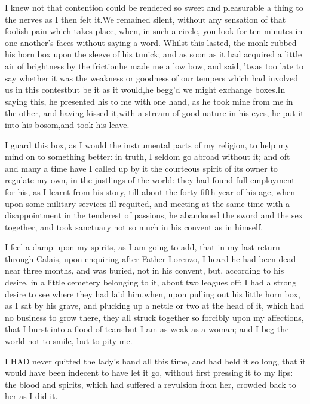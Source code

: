 \documentclass[twoside]{article}
\begin{document}
I knew not that contention could be rendered so sweet and pleasurable a
thing to the nerves as I then felt it.\tsk We remained silent, without any
sensation of that foolish pain which takes place, when, in such a circle,
you look for ten minutes in one another’s faces without saying a word.
Whilst this lasted, the monk rubbed his horn box upon the sleeve of his
tunick; and as soon as it had acquired a little air of brightness by the
friction\tsk he made me a low bow, and said, ’twas too late to say whether it
was the weakness or goodness of our tempers which had involved us in this
contest\tsk but be it as it would,\tsk he begg’d we might exchange boxes.\tsk In
saying this, he presented his to me with one hand, as he took mine from
me in the other, and having kissed it,\tsk with a stream of good nature in
his eyes, he put it into his bosom,\tsk and took his leave.

I guard this box, as I would the instrumental parts of my religion, to
help my mind on to something better: in truth, I seldom go abroad without
it; and oft and many a time have I called up by it the courteous spirit
of its owner to regulate my own, in the justlings of the world: they had
found full employment for his, as I learnt from his story, till about the
forty-fifth year of his age, when upon some military services ill
requited, and meeting at the same time with a disappointment in the
tenderest of passions, he abandoned the sword and the sex together, and
took sanctuary not so much in his convent as in himself.

I feel a damp upon my spirits, as I am going to add, that in my last
return through Calais, upon enquiring after Father Lorenzo, I heard he
had been dead near three months, and was buried, not in his convent, but,
according to his desire, in a little cemetery belonging to it, about two
leagues off: I had a strong desire to see where they had laid him,\tsk when,
upon pulling out his little horn box, as I sat by his grave, and plucking
up a nettle or two at the head of it, which had no business to grow
there, they all struck together so forcibly upon my affections, that I
burst into a flood of tears:\tsk but I am as weak as a woman; and I beg the
world not to smile, but to pity me.






I HAD never quitted the lady’s hand all this time, and had held it so
long, that it would have been indecent to have let it go, without first
pressing it to my lips: the blood and spirits, which had suffered a
revulsion from her, crowded back to her as I did it.
\end{document}

